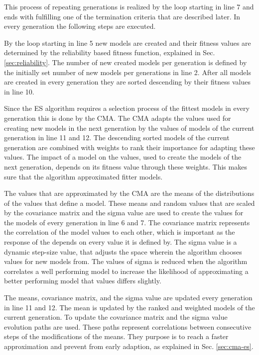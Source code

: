 This process of repeating generations is realized by the loop starting in line 7 and ends with fulfilling one of the termination criteria that are described later.
In every generation the following steps are executed.

By the loop starting in line 5 new models are created and their fitness values are determined by the reliability based fitness function, explained in Sec. \ref{sec:reliability}.
The number of new created models per generation is defined by the initially set number of new models per generations in line 2.
After all models are created in every generation they are sorted descending by their fitness values in line 10.

Since the \ac{ES} algorithm requires a selection process of the fittest models in every generation this is done by the \ac{CMA}.
The \ac{CMA} adapts the values used for creating new models in the next generation by the values of models of the current generation in line 11 and 12.
The descending sorted models of the current generation are combined with weights to rank their importance for adapting these values.
The impact of a model on the values, used to create the models of the next generation, depends on its fitness value through these weights.
This makes sure that the algorithm approximated fitter models.

The values that are approximated by the \ac{CMA} are the means of the distributions of the values that define a model.
These means and random values that are scaled by the covariance matrix and the sigma value are used to create the values for the models of every generation in line 6 and 7.
The covariance matrix represents the correlation of the model values to each other, which is important as the response of the \apuf depends on every value it is defined by.
The sigma value is a dynamic step-size value, that adjusts the space wherein the algorithm chooses values for new models from.
The values of sigma is reduced when the algorithm correlates a well performing model to increase the likelihood of approximating a better performing model that values differs slightly.

The means, covariance matrix, and the sigma value are updated every generation in line 11 and 12.
The mean is updated by the ranked and weighted models of the current generation.
To update the covariance matrix and the sigma value evolution paths are used.
These paths represent correlations between consecutive steps of the modifications of the means. They purpose is to reach a faster approximation and prevent from early adaption, as explained in Sec. \ref{sec:cma-es}.

